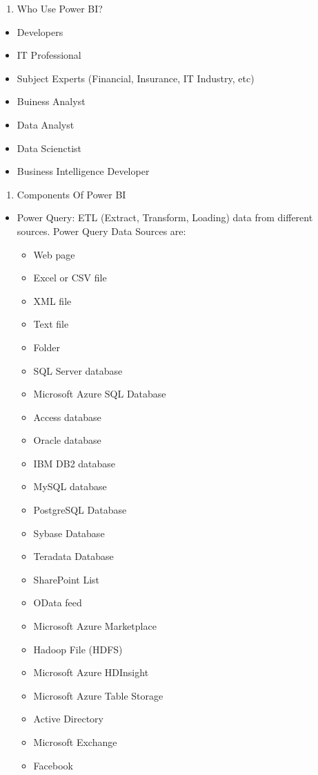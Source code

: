 \documentclass[]{book}
\providecommand{\tightlist}{%
  \setlength{\itemsep}{0pt}\setlength{\parskip}{0pt}}
\begin{document}
\begin{enumerate}
\def\labelenumi{\arabic{enumi}.}
\setcounter{enumi}{2}
\tightlist
\item
  Who Use Power BI?
\end{enumerate}

\begin{itemize}
\tightlist
\item
  Developers
\item
  IT Professional
\item
  Subject Experts (Financial, Insurance, IT Industry, etc)
\item
  Buiness Analyst
\item
  Data Analyst
\item
  Data Scienctist
\item
  Business Intelligence Developer
\end{itemize}

\begin{enumerate}
\def\labelenumi{\arabic{enumi}.}
\setcounter{enumi}{3}
\tightlist
\item
  Components Of Power BI
\end{enumerate}

\begin{itemize}
\tightlist
\item
  Power Query: ETL (Extract, Transform, Loading) data from different
  sources. Power Query Data Sources are:

  \begin{itemize}
  \tightlist
  \item
    Web page
  \item
    Excel or CSV file
  \item
    XML file
  \item
    Text file
  \item
    Folder
  \item
    SQL Server database
  \item
    Microsoft Azure SQL Database
  \item
    Access database
  \item
    Oracle database
  \item
    IBM DB2 database
  \item
    MySQL database
  \item
    PostgreSQL Database
  \item
    Sybase Database
  \item
    Teradata Database
  \item
    SharePoint List
  \item
    OData feed
  \item
    Microsoft Azure Marketplace
  \item
    Hadoop File (HDFS)
  \item
    Microsoft Azure HDInsight
  \item
    Microsoft Azure Table Storage
  \item
    Active Directory
  \item
    Microsoft Exchange
  \item
    Facebook
  \end{itemize}
\end{itemize}
\end{document}
